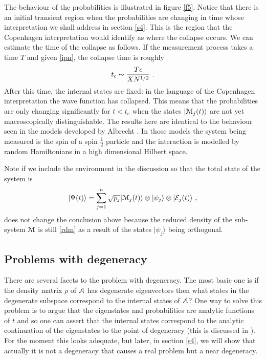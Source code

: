\documentclass[12pt]{article}
\def\BM{{\EuScript M}}
\def\BA{{\EuScript A}}
\def\ket#1{| #1\rangle}
\newcommand{\EQ}[1]{\begin{equation}\begin{split} #1
\end{split}\end{equation}}
\begin{document}
The behaviour of the probabilities is illustrated in figure \ref{f5}. Notice that there is an initial transient region when the probabilities are changing in time whose interpretation we shall address in section \ref{s4}. This is the region that the Copenhagen interpretation would identify as where the collapse occurs.
We can estimate the time of the collapse as follows.
If the measurement process takes a time $T$ and given \eqref{ipn}, the 
collapse time is roughly
\EQ{
t_\text{c}\thicksim \frac{T\epsilon}{XN^{1/2}}\ .
\label{loc}
}
After this time, the internal states are fixed: in the language of the Copenhagen interpretation the wave function has collapsed. This means that the probabilities are only changing significantly for $t<t_\text{c}$ when the states $\ket{\BM_j(t)}$ are not yet macroscopically distinguishable.  The results here are identical to the behaviour seen in the models developed by Albrecht \cite{Albrecht:1992rs,Albrecht:1992uc}. In those models the system being measured is the spin of a spin $\frac12$ particle and the interaction is modelled by random Hamiltonians in a high dimensional Hilbert space.

Note if we include the environment in the discussion so that the total state of the system is
\EQ{
\ket{\Psi(t)}=\sum_{j=1}^n\sqrt{p_j}\ket{\BM_j(t)}\otimes\ket{\psi_j}\otimes\ket{{\cal E}_j(t)}\ ,
\label{ww2}
}
does not change the conclusion above because the reduced density of the sub-system $\BM$ is still \eqref{rdm} as a result of the states $\ket{\psi_j}$ being orthogonal.

\subsection{Problems with degeneracy}\label{s3.1}

There are several facets to the problem with degeneracy.
The most basic one is if the density matrix $\rho$ of $\BA$ has degenerate eigenvectors then what states in the degenerate subspace correspond to the internal states of $\BA$? One way to solve this problem is to argue that the eigenstates and probabilities 
are analytic functions of $t$ and so one can assert that the internal states correspond to the analytic continuation of the eigenstates to the point of degeneracy (this is discussed in \cite{BDV}). For the moment this looks adequate, but later, in section \ref{s4}, we will show that actually it is not a degeneracy that causes a real problem but a near degeneracy.
\end{document}
